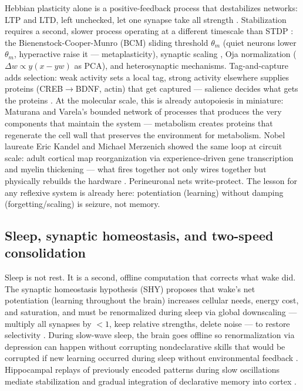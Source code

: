 \documentclass[11pt]{article}
\begin{document}
Hebbian plasticity alone is a positive-feedback process that destabilizes networks: LTP and LTD, left unchecked, let one synapse take all strength \citep{tononi2014}. Stabilization requires a second, slower process operating at a different timescale than STDP \citep{tononi2014}: the Bienenstock-Cooper-Munro (BCM) sliding threshold $\theta_m$ (quiet neurons lower $\theta_m$, hyperactive raise it --- metaplasticity), synaptic scaling \citep{tononi2014}, Oja normalization ($\Delta w \propto y(x - yw)$ as PCA), and heterosynaptic mechanisms. Tag-and-capture adds selection: weak activity sets a local tag, strong activity elsewhere supplies proteins (CREB$\to$BDNF, actin) that get captured --- salience decides what gets the proteins \citep{tononi2014}. At the molecular scale, this is already autopoiesis in miniature: Maturana and Varela's bounded network of processes that produces the very components that maintain the system \citep{maturana1980} --- metabolism creates proteins that regenerate the cell wall that preserves the environment for metabolism. Nobel laureate Eric Kandel and Michael Merzenich showed the same loop at circuit scale: adult cortical map reorganization via experience-driven gene transcription and myelin thickening --- what fires together not only wires together but physically rebuilds the hardware \citep{maturana1980}. Perineuronal nets write-protect. The lesson for any reflexive system is already here: potentiation (learning) without damping (forgetting/scaling) is seizure, not memory.

\subsection{Sleep, synaptic homeostasis, and two-speed consolidation}

Sleep is not rest. It is a second, offline computation that corrects what wake did. The synaptic homeostasis hypothesis (SHY) proposes that wake's net potentiation (learning throughout the brain) increases cellular needs, energy cost, and saturation, and must be renormalized during sleep via global downscaling --- multiply all synapses by $<1$, keep relative strengths, delete noise --- to restore selectivity \citep{tononi2014}. During slow-wave sleep, the brain goes offline so renormalization via depression can happen without corrupting nondeclarative skills that would be corrupted if new learning occurred during sleep without environmental feedback \citep{tononi2014}. Hippocampal replays of previously encoded patterns during slow oscillations mediate stabilization and gradual integration of declarative memory into cortex \citep{tononi2014}.
\end{document}
